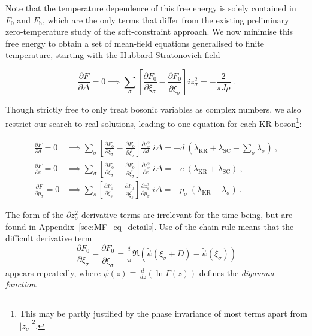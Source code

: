 
Note that the temperature dependence of this free energy is solely contained in $ F_0 $ and $ F_{\text{h}} $, which are the only terms that differ from the existing preliminary zero-temperature study of the soft-constraint approach. We now minimise this free energy to obtain a set of mean-field equations generalised to finite temperature, starting with the Hubbard-Stratonovich field

\begin{equation}
\frac{\partial F}{\partial \Delta} = 0 \implies \sum_{\sigma} \left[ \frac{\partial F_{0}}{\partial \xi_{\sigma}} - \frac{\partial F_{0}}{\partial \overline{\xi_{\sigma}}} \right] i z^2_{\sigma} = - \frac{2}{\pi J \rho} ~ .
\label{eq:MF_delta}
\end{equation}

Though strictly free to only treat bosonic variables as complex numbers, we also restrict our search to real solutions, leading to one equation for each KR boson\footnote{This may be partly justified by the phase invariance of most terms apart from $ | z_{\sigma} |^2 $.}: %

\begin{align}
\frac{\partial F}{\partial d} = 0 &\implies \sum_{\sigma} \left[ \frac{\partial F_{0}}{\partial \xi_{\sigma}} - \frac{\partial F_{0}}{\partial \overline{\xi_{\sigma}}} \right] \frac{\partial z^2_{\sigma}}{\partial d} ~ i \Delta = -d ~ ( \lambda_{\text{KR}} + \lambda_{\text{SC}} -  \sum_{\sigma} \lambda_{\sigma} ) ~ , \label{eq:MF_d} \\
\frac{\partial F}{\partial e} = 0 &\implies \sum_{\sigma} \left[ \frac{\partial F_{0}}{\partial \xi_{\sigma}} - \frac{\partial F_{0}}{\partial \overline{\xi_{\sigma}}} \right] \frac{\partial z^2_{\sigma}}{\partial e} ~ i \Delta = -e ~ ( \lambda_{\text{KR}} + \lambda_{\text{SC}} ) ~ , \label{eq:MF_e} \\
\frac{\partial F}{\partial p_{\sigma}} = 0 &\implies \sum_{s} \left[ \frac{\partial F_{0}}{\partial \xi_{s}} - \frac{\partial F_{0}}{\partial \overline{\xi_{s}}} \right] \frac{\partial z^2_{s}}{\partial p_{\sigma}} ~ i \Delta = - p_{\sigma} ~ (\lambda_{\text{KR}} - \lambda_{\sigma}) ~ . \label{eq:MF_p}
\end{align}

The form of the $ \partial z^2_{\sigma} $ derivative terms are irrelevant for the time being, but are found in Appendix~\ref{sec:MF_eq_details}. Use of the chain rule means that the difficult derivative term
\begin{equation}
\frac{\partial F_{0}}{\partial \xi_{\sigma}} - \frac{\partial F_{0}}{\partial \overline{\xi_{\sigma}}} = \frac{i}{\pi} \Re{( \widetilde{\psi}(\xi_{\sigma} + D) - \widetilde{\psi}(\xi_{\sigma}))}
\end{equation}
appears repeatedly, where $ \psi(z) \equiv \frac{d}{\,dz}(\ln{\Gamma(z)}) $ defines the \textit{digamma function}.

